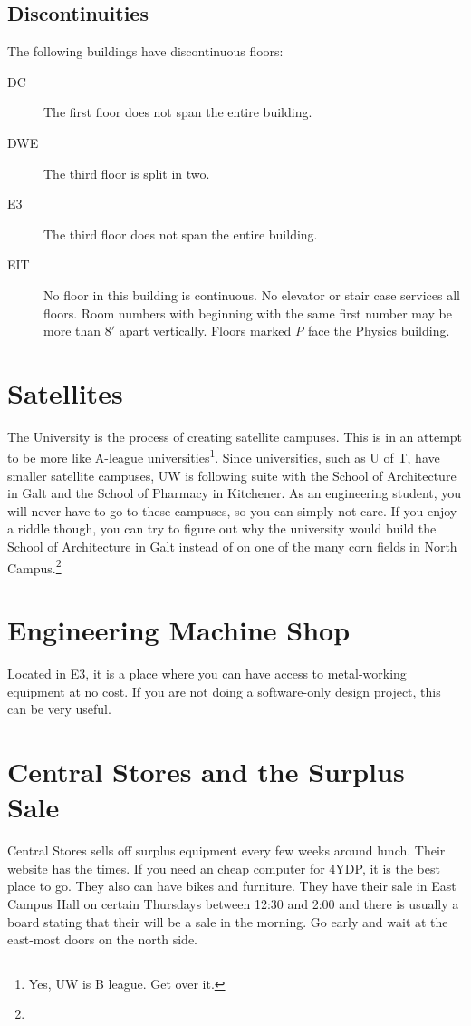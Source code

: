 \documentclass{book}
\begin{document}
\subsection{Discontinuities}
The following buildings have discontinuous floors:

\begin{description}
\item[DC] The first floor does not span the entire building.
\item[DWE] The third floor is split in two.
\item[E3] The third floor does not span the entire building.
\item[EIT] No floor in this building is continuous. No elevator or stair case services all floors. Room numbers with beginning with the same first number may be more than $8'$ apart vertically. Floors marked \textsl{P} face the Physics building.
\end{description}

\section{Satellites}
The University is the process of creating satellite campuses. This is in an attempt to be more like A-league universities\footnote{Yes, UW is B league. Get over it.}. Since universities, such as U of T, have smaller satellite campuses, UW is following suite with the School of Architecture in Galt and the School of Pharmacy in Kitchener. As an engineering student, you will never have to go to these campuses, so you can simply not care. If you enjoy a riddle though, you can try to figure out why the university would build the School of Architecture in Galt instead of on one of the many corn fields in North Campus.\footnote{}

\section{Engineering Machine Shop}
Located in E3, it is a place where you can have access to metal-working equipment at no cost. If you are not doing a software-only design project, this can be very useful.

\section{Central Stores and the Surplus Sale}
Central Stores sells off surplus equipment every few weeks around lunch. Their website has the times. If you need an cheap computer for 4YDP, it is the best place to go. They also can have bikes and furniture. They have their sale in East Campus Hall on certain Thursdays between 12:30 and 2:00 and there is usually a board stating that their will be a sale in the morning. Go early and wait at the east-most doors on the north side.
\end{document}

